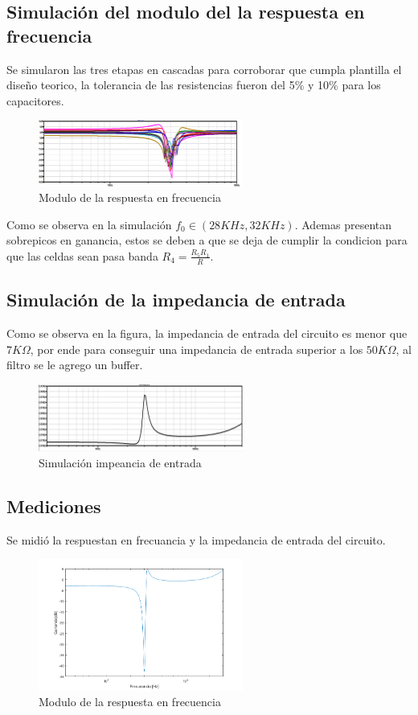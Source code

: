 \documentclass[../../tc_tp5_main.tex]{subfiles}
\begin{document}
\subsection{Simulación del modulo del la respuesta en frecuencia}
Se simularon las tres etapas en cascadas para corroborar que cumpla plantilla el diseño teorico, la tolerancia de las resistencias fueron del 5\% y 10\% para los capacitores.
\begin{figure}[H]	
	\centering
	\includegraphics[width=0.6\textwidth]{imagenes/montecarlo.png}
	\caption{Modulo de la respuesta en frecuencia}
\end{figure}
Como se observa en la simulación $f_0\in (28KHz,32KHz)$. Ademas presentan sobrepicos en ganancia, estos se deben a que se deja de cumplir la condicion para que las celdas sean pasa banda $R_4=\frac{R_5 R_1}{R}$.
\subsection{Simulación de la impedancia de entrada}
Como se observa en la figura, la impedancia de entrada del circuito es menor que $7K\Omega$, por ende para conseguir una impedancia de entrada superior a los $50K\Omega$, al filtro se le agrego un buffer.
\begin{figure}[H]	
	\centering
	\includegraphics[width=0.6\textwidth]{imagenes/zinsim.png}
	\caption{Simulación impeancia de entrada}
\end{figure}
\subsection{Mediciones}

Se midió la respuestan en frecuancia y la impedancia de entrada del circuito.

\begin{figure}[H]	
	\centering
	\includegraphics[width=0.6\textwidth]{imagenes/mag.png}
	\caption{Modulo de la respuesta en frecuencia}
\end{figure}
\end{document}
